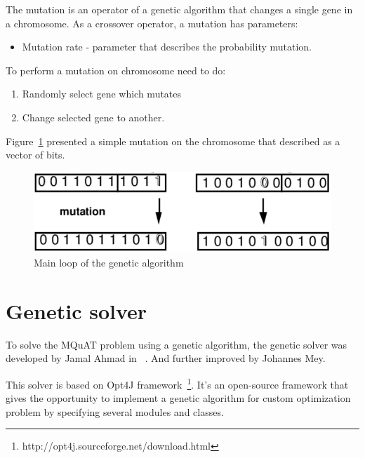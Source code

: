 The mutation is an operator of a genetic algorithm that changes a single gene in a chromosome. As a crossover operator, a mutation has parameters:

\begin{itemize}
	\item Mutation rate - parameter that describes the probability mutation.
\end{itemize}

To perform a mutation on chromosome need to do:
\begin{enumerate}
	\item Randomly select gene which mutates
	\item Change selected gene to another.
\end{enumerate}

Figure~\ref{fig:MutationVector} presented a simple mutation on the chromosome that described as a vector of bits.

\begin{figure}
	\centering
	\includegraphics[width=\textwidth]{images/MutationVector.png}
	\caption{Main loop of the genetic algorithm}
	\label{fig:MutationVector}
\end{figure}


\section{Genetic solver}
To solve the MQuAT problem using a genetic algorithm, the genetic solver was developed by Jamal Ahmad in ~\cite{ahmad18}. And further improved by Johannes Mey.

This solver is based on Opt4J framework~\footnote{http://opt4j.sourceforge.net/download.html}. It's an open-source framework that gives the opportunity to implement a genetic algorithm for custom optimization problem by specifying several modules and classes.

